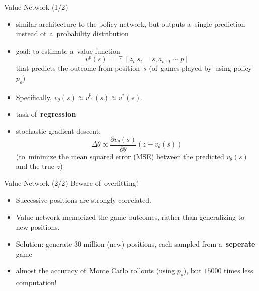 \documentclass{beamer}
\newcommand{\E}{\mathop{\mathbb{E}}}
\begin{document}
{    \begin{frame}{Value Network (1/2)}
      \begin{itemize}[<+- | alert@+>]
        \item similar architecture to the policy network, but outputs a~single prediction instead of~a~probability distribution
        \item goal: to estimate a~value function
          \[
            v^p(s) = \E [z_t | s_t = s, a_{t \dots T} \sim p]
          \]
          that predicts the outcome from position~$s$ (of~games played by~using policy $p_\rho$)
        \item Specifically, $v_\theta(s) \approx v^{p_\rho}(s) \approx v^*(s)$.
        \item task of~\textbf{regression}
        \item stochastic gradient descent:
          \[
            \Delta \theta \propto \frac{\partial v_\theta (s)}{\partial \theta} (z - v_\theta(s))
          \]
          {\tiny (to~minimize the mean squared error (MSE) between the predicted $v_\theta(s)$ and the true $z$)}
      \end{itemize}
    \end{frame}

    \begin{frame}{Value Network (2/2)}
      Beware of~overfitting!
      \pause
      \begin{itemize}[<+- | alert@+>]
        \item Successive positions are strongly correlated.
        \item Value network memorized the game outcomes, rather than generalizing to new positions.
        \item Solution: generate 30 million (new) positions, each sampled from a~\textbf{seperate} game
        \item almost the accuracy of~Monte Carlo rollouts (using $p_\rho$), but $15000$ times less computation!
      \end{itemize}
    \end{frame}

}
\end{document}
